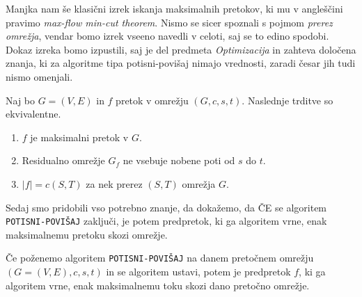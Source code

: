 \documentclass[mat1]{fmfdelo}
\begin{document}
Manjka nam še klasični izrek iskanja maksimalnih pretokov, ki mu v angleščini pravimo \textit{max-flow min-cut theorem}. Nismo se sicer spoznali s pojmom \textit{prerez omrežja}, vendar bomo izrek vseeno navedli v celoti, saj se to edino spodobi. Dokaz izreka bomo izpustili, saj je del predmeta \textit{Optimizacija} in zahteva
določena znanja, ki za algoritme tipa potisni-povišaj nimajo vrednosti, zaradi česar jih tudi nismo omenjali.

\begin{izrek} \label{izr:maxflowmincut}
  Naj bo $G = (V,E)$ in $f$ pretok v omrežju $(G, c, s, t)$. Naslednje trditve so ekvivalentne.
  \begin{enumerate}
    \item $f$ je maksimalni pretok v $G$.
    \item Residualno omrežje $G_f$ ne vsebuje nobene poti od $s$ do $t$.
    \item $|f| = c(S, T)$ za nek prerez $(S,T)$ omrežja $G$.
  \end{enumerate}
\end{izrek}

Sedaj smo pridobili vso potrebno znanje, da dokažemo, da ČE se algoritem \texttt{POTISNI-POVIŠAJ} zaključi, je potem predpretok, ki ga algoritem vrne, enak maksimalnemu pretoku skozi omrežje.

\begin{izrek}
Če poženemo algoritem \texttt{POTISNI-POVIŠAJ} na danem pretočnem omrežju $(G=(V,E),c,s,t)$ in se algoritem ustavi, potem je predpretok $f$, ki ga algoritem vrne, enak maksimalnemu toku skozi dano pretočno omrežje.
\end{izrek}
\end{document}
